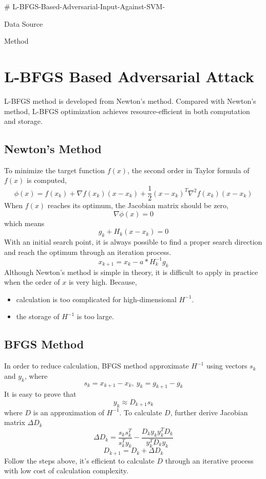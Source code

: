 # L-BFGS-Based-Adversarial-Input-Against-SVM-

Data Source

Method
\section{L-BFGS Based Adversarial Attack}

L-BFGS method is developed from Newton's method. Compared with Newton's method, L-BFGS optimization achieves resource-efficient in both computation and storage.

\subsection{Newton's Method}
To minimize the target function $f(x)$, the second order in Taylor formula of $f(x)$ is computed,
\begin{equation}
       \phi(x)=f(x_k)+\nabla f(x_k)(x-x_k)+\frac{1}{2}(x-x_k)^T\nabla^2  f(x_k)(x-x_k)
\end{equation}
When $f(x)$ reaches its optimum, the Jacobian matrix should be zero,
\begin{equation}
       \nabla \phi(x)=0
\end{equation}
which means
\begin{equation}
       g_k+H_k(x-x_k)=0
\end{equation}
With an initial search point, it is always possible to find a proper search direction and reach the optimum through an iteration process.
\begin{equation}
       x_{k+1}=x_k-a*H_k^{-1}g_k
\end{equation}
Although Newton's method is simple in theory, it is difficult to apply in practice when the order of $x$ is very high. Because,
\begin{itemize}
      \item calculation is too complicated for high-dimensional $H^{-1}$.
      \item the storage of $H^{-1}$ is too large.
  \end{itemize}
  
\subsection{BFGS Method}
In order to reduce calculation, BFGS method approximate $H^{-1}$ using vectors $s_k$ and $y_k$, where
\begin{equation}
s_k=x_{k+1}-x_{k},\ y_k=g_{k+1}-g_k
\end{equation}
It is easy to prove that
\begin{equation}
y_k\approx D_{k+1}s_k
\end{equation}
where $D$ is an approximation of $H^{-1}$.
To calculate $D$, further derive Jacobian matrix $\Delta D_k$
\begin{equation}
\Delta D_k=\frac{s_ks_k^T}{s_k^Ty_k}-\frac{D_ky_ky_k^TD_k}{y_k^TD_ky_k}
\end{equation}
\begin{equation}
D_{k+1}=D_k+\Delta D_k
\end{equation}
Follow the steps above, it's efficient to calculate $D$ through an iterative process with low cost of calculation complexity. 

